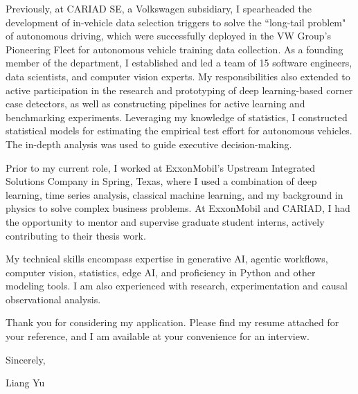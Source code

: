 \documentclass[11pt]{letter} %
\begin{document}
\begin{letter}{
}
Previously, at CARIAD SE, a Volkswagen subsidiary, I spearheaded the development of in-vehicle data selection triggers to solve the ``long-tail problem" of autonomous driving, which were successfully deployed in the VW Group's Pioneering Fleet for autonomous vehicle training data collection. As a founding member of the department, I established and led a team of 15 software engineers, data scientists, and computer vision experts. My responsibilities also extended to active participation in the research and prototyping of deep learning-based corner case detectors, as well as constructing pipelines for active learning and benchmarking experiments. Leveraging my knowledge of statistics, I constructed statistical models for estimating the empirical test effort for autonomous vehicles. The in-depth analysis was used to guide executive decision-making.

Prior to my current role, I worked at ExxonMobil's Upstream Integrated Solutions Company in Spring, Texas, where I used a combination of deep learning, time series analysis, classical machine learning, and my background in physics to solve complex business problems. At ExxonMobil and CARIAD, I had the opportunity to mentor and supervise graduate student interns, actively contributing to their thesis work.

My technical skills encompass expertise in generative AI, agentic workflows, computer vision, statistics, edge AI, and proficiency in Python and other modeling tools. I am also experienced with research, experimentation and causal observational analysis.

Thank you for considering my application. Please find my resume attached for your reference, and I am available at your convenience for an interview.

Sincerely,

Liang Yu




\end{letter}
\end{document}
